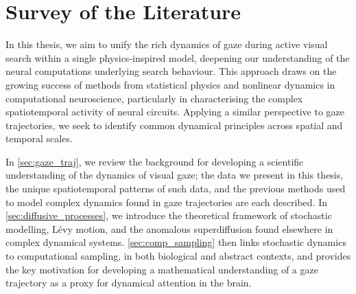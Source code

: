 \chapter{Survey of the Literature}\label{chap:literature_review}
In this thesis, we aim to unify the rich dynamics of gaze during active visual search within a single physics-inspired model, deepening our understanding of the neural computations underlying search behaviour. This approach draws on the growing success of methods from statistical physics and nonlinear dynamics in computational neuroscience, particularly in characterising the complex spatiotemporal activity of neural circuits. Applying a similar perspective to gaze trajectories, we seek to identify common dynamical principles across spatial and temporal scales.

In \cref{sec:gaze_traj}, we review the background for developing a scientific understanding of the dynamics of visual gaze; the data we present in this thesis, the unique spatiotemporal patterns of such data, and the previous methods used to model complex dynamics found in gaze trajectories are each described. In \cref{sec:diffusive_processes}, we introduce the theoretical framework of stochastic modelling, Lévy motion, and the anomalous superdiffusion found elsewhere in complex dynamical systems. \cref{sec:comp_sampling} then links stochastic dynamics to computational sampling, in both biological and abstract contexts, and provides the key motivation for developing a mathematical understanding of a gaze trajectory as a proxy for dynamical attention in the brain. 






